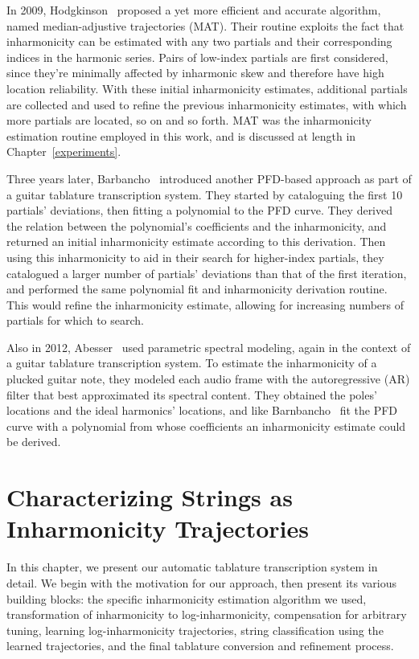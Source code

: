 \documentclass[12pt]{cmuthesis}
\begin{document}
In 2009, Hodgkinson~\cite{hodgkinson2009} proposed a yet more efficient and accurate algorithm, named median-adjustive trajectories (MAT). Their routine exploits the fact that inharmonicity can be estimated with any two partials and their corresponding indices in the harmonic series. Pairs of low-index partials are first considered, since they're minimally affected by inharmonic skew and therefore have high location reliability. With these initial inharmonicity estimates, additional partials are collected and used to refine the previous inharmonicity estimates, with which more partials are located, so on and so forth. MAT was the inharmonicity estimation routine employed in this work, and is discussed at length in Chapter~\ref{experiments}.

Three years later, Barbancho~\cite{barbanchoi2012} introduced another PFD-based approach as part of a guitar tablature transcription system. They started by cataloguing the first 10 partials' deviations, then fitting a polynomial to the PFD curve. They derived the relation between the polynomial's coefficients and the inharmonicity, and returned an initial inharmonicity estimate according to this derivation. Then using this inharmonicity to aid in their search for higher-index partials, they catalogued a larger number of partials' deviations than that of the first iteration, and performed the same polynomial fit and inharmonicity derivation routine. This would refine the inharmonicity estimate, allowing for increasing numbers of partials for which to search.

Also in 2012, Abesser~\cite{abesser2012} used parametric spectral modeling, again in the context of a guitar tablature transcription system. To estimate the inharmonicity of a plucked guitar note, they modeled each audio frame with the autoregressive (AR) filter that best approximated its spectral content. They obtained the poles' locations and the ideal harmonics' locations, and like Barnbancho~\cite{barbanchoi2012} fit the PFD curve with a polynomial from whose coefficients an inharmonicity estimate could be derived.



\noindent
\chapter{Characterizing Strings as Inharmonicity Trajectories}
\label{chap:method}
In this chapter, we present our automatic tablature transcription system in detail. We begin with the motivation for our approach, then present its various building blocks: the specific inharmonicity estimation algorithm we used, transformation of inharmonicity to log-inharmonicity, compensation for arbitrary tuning, learning log-inharmonicity trajectories, string classification using the learned trajectories, and the final tablature conversion and refinement process.
\end{document}
